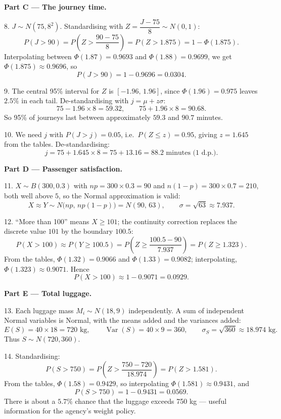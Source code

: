\documentclass[11pt]{article}
\begin{document}
\textbf{Part C — The journey time.}\par
8. $J \sim N(75, 8^2)$. Standardising with $Z = \dfrac{J - 75}{8} \sim N(0,1)$:
\[
P(J > 90) = P\!\left(Z > \frac{90-75}{8}\right) = P(Z > 1.875) = 1 - \Phi(1.875).
\]
Interpolating between $\Phi(1.87) = 0.9693$ and $\Phi(1.88) = 0.9699$, we get $\Phi(1.875) \approx 0.9696$, so
\[
P(J > 90) = 1 - 0.9696 = 0.0304.
\]

9. The central 95\% interval for $Z$ is $[-1.96,\, 1.96]$, since $\Phi(1.96) = 0.975$ leaves $2.5\%$ in each tail. De-standardising with $j = \mu + z\sigma$:
\[
75 - 1.96 \times 8 = 59.32, \qquad 75 + 1.96 \times 8 = 90.68.
\]
So 95\% of journeys last between approximately $59.3$ and $90.7$ minutes.

10. We need $j$ with $P(J > j) = 0.05$, i.e.\ $P(Z \le z) = 0.95$, giving $z = 1.645$ from the tables. De-standardising:
\[
j = 75 + 1.645 \times 8 = 75 + 13.16 = 88.2 \text{ minutes (1 d.p.).}
\]

\textbf{Part D — Passenger satisfaction.}\par
11. $X \sim B(300, 0.3)$ with $np = 300 \times 0.3 = 90$ and $n(1-p) = 300 \times 0.7 = 210$, both well above $5$, so the Normal approximation is valid:
\[
X \approx Y \sim N\big(np,\, np(1-p)\big) = N(90,\, 63), \qquad \sigma = \sqrt{63} \approx 7.937.
\]

12. ``More than 100'' means $X \ge 101$; the continuity correction replaces the discrete value $101$ by the boundary $100.5$:
\[
P(X > 100) \approx P(Y \ge 100.5) = P\!\left(Z \ge \frac{100.5 - 90}{7.937}\right) = P(Z \ge 1.323).
\]
From the tables, $\Phi(1.32) = 0.9066$ and $\Phi(1.33) = 0.9082$; interpolating, $\Phi(1.323) \approx 0.9071$. Hence
\[
P(X > 100) \approx 1 - 0.9071 = 0.0929.
\]

\textbf{Part E — Total luggage.}\par
13. Each luggage mass $M_i \sim N(18, 9)$ independently. A sum of independent Normal variables is Normal, with the means added and the variances added:
\[
E(S) = 40 \times 18 = 720 \text{ kg}, \qquad \operatorname{Var}(S) = 40 \times 9 = 360, \qquad \sigma_S = \sqrt{360} \approx 18.974 \text{ kg}.
\]
Thus $S \sim N(720, 360)$.

14. Standardising:
\[
P(S > 750) = P\!\left(Z > \frac{750 - 720}{18.974}\right) = P(Z > 1.581).
\]
From the tables, $\Phi(1.58) = 0.9429$, so interpolating $\Phi(1.581) \approx 0.9431$, and
\[
P(S > 750) = 1 - 0.9431 = 0.0569.
\]
There is about a $5.7\%$ chance that the luggage exceeds 750 kg — useful information for the agency's weight policy.
\end{document}
